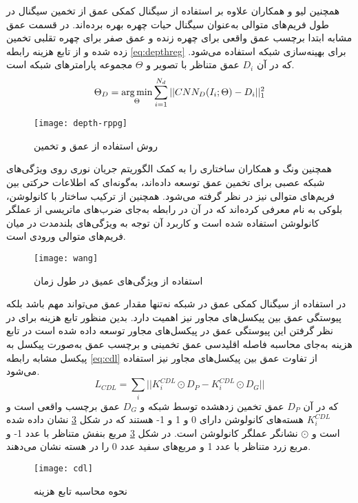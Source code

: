    همچنین لیو و همکاران
\cite{liu2018learning}
   علاوه بر استفاده از سیگنال کمکی عمق از تخمین سیگنال  در طول فریم‌های متوالی به‌عنوان سیگنال حیات چهره بهره برده‌اند. در قسمت عمق مشابه
\cite{atoum2017face}
   ابتدا برچسب عمق واقعی برای چهره زنده و عمق صفر برای چهره تقلبی تخمین زده شده و از تابع هزینه رابطه
\ref{eq:depthreg}
   برای بهینه‌سازی شبکه استفاده می‌شود. که در آن 
$D_i$
 عمق متناظر با تصویر و 
$\Theta$
مجموعه پارامتر‌های شبکه است.
\begin{equation}\label{eq:depthreg}
	\Theta_D = \operatorname*{arg\,min}_\Theta{\sum_{i=1}^{N_d}||CNN_D(I_i;\Theta)-D_i||^2_1} 
\end{equation}

\begin{figure}[t]
	\centerline{\texttt{[image: depth-rppg]}}
	\caption{روش استفاده از عمق و تخمین  \cite{liu2018learning}}
	\label{fig:depth-rppg}
\end{figure}

همچنین ونگ و همکاران
\cite{wang2018exploiting}
ساختاری را به کمک الگوریتم جریان نوری
 روی ویژگی‌های شبکه عصبی برای تخمین عمق توسعه داده‌اند، به‌گونه‌ای که اطلاعات حرکتی بین فریم‌های متوالی نیز در نظر گرفته می‌شود. همچنین از ترکیب ساختار
  \cite{cho2014learning}
با کانولوشن، بلوکی به نام  معرفی کرده‌اند که در آن در رابطه  به‌جای ضرب‌های ماتریسی از عملگر کانولوشن استفاده شده است و کاربرد آن توجه به ویژگی‌های بلند‌مدت در میان فریم‌های متوالی ورودی است.

\begin{figure}[h]
	\centerline{\texttt{[image: wang]}}
	\caption{استفاده از ویژگی‌های عمیق در طول زمان \cite{wang2018exploiting}}
	\label{fig:wang}
\end{figure}
در استفاده از سیگنال کمکی عمق در شبکه نه‌تنها مقدار عمق می‌تواند مهم باشد بلکه پیوستگی عمق بین پیکسل‌های مجاور نیز اهمیت دارد. بدین منظور تابع هزینه  برای در نظر گرفتن این پیوستگی عمق در پیکسل‌های مجاور توسعه داده شده است
\cite{wang2020deep,wang2018exploiting}
در تابع هزینه  به‌جای محاسبه فاصله اقلیدسی عمق تخمینی و برچسب عمق به‌صورت پیکسل به پیکسل مشابه رابطه
\ref{eq:cdl}
 از تفاوت عمق بین پیکسل‌های مجاور نیز استفاده می‌شود.
\begin{equation}\label{eq:cdl}
	L_{CDL} = \sum_{i}||K_i^{CDL} \odot D_P-K_i^{CDL} \odot D_G||
\end{equation}
که در آن
$D_P$
عمق تخمین زدهشده توسط شبکه و
$D_G$
عمق برچسب واقعی است و
$K_i^{CDL}$
هسته‌های کانولوشن دارای 0 و 1 و 1- هستند که در شکل
\ref{fig:cdl}
نشان داده شده است و 
$\odot$
 نشانگر عملگر کانولوشن است. در شکل
\ref{fig:cdl}
مربع بنفش متناظر با عدد 1- و مربع زرد متناظر با عدد 1 و مربع‌های سفید عدد 0 را در هسته نشان می‌دهند. 
 \begin{figure}[h]
 	\centerline{\texttt{[image: cdl]}}
 	\caption{نحوه محاسبه تابع هزینه  \cite{yu2020searching}}
 	\label{fig:cdl}
 \end{figure}

